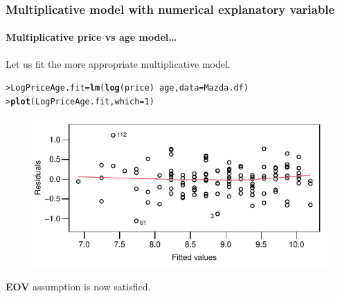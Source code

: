 \documentclass{beamer}\usepackage[]{graphicx}\usepackage[]{xcolor}
\makeatletter
\newcommand{\hlnum}[1]{\textcolor[rgb]{0.686,0.059,0.569}{#1}}%
\newcommand{\hlopt}[1]{\textcolor[rgb]{0,0,0}{#1}}%
\newcommand{\hlstd}[1]{\textcolor[rgb]{0.345,0.345,0.345}{#1}}%
\newcommand{\hlkwb}[1]{\textcolor[rgb]{0.69,0.353,0.396}{#1}}%
\newcommand{\hlkwc}[1]{\textcolor[rgb]{0.333,0.667,0.333}{#1}}%
\newcommand{\hlkwd}[1]{\textcolor[rgb]{0.737,0.353,0.396}{\textbf{#1}}}%
\newenvironment{kframe}{%
 \def\at@end@of@kframe{}%
 \ifinner\ifhmode%
  \def\at@end@of@kframe{\end{minipage}}%
  \begin{minipage}{\columnwidth}%
 \fi\fi%
 \def\FrameCommand##1{\hskip\@totalleftmargin \hskip-\fboxsep
 \colorbox{shadecolor}{##1}\hskip-\fboxsep
     \hskip-\linewidth \hskip-\@totalleftmargin \hskip\columnwidth}%
 \MakeFramed {\advance\hsize-\width
   \@totalleftmargin\z@ \linewidth\hsize
   \@setminipage}}%
 {\par\unskip\endMakeFramed%
 \at@end@of@kframe}
\newenvironment{knitrout}{}{} %
\makeatother
\begin{document}
\begin{frame}[fragile, t]
\frametitle{Multiplicative model with numerical explanatory variable}
\framesubtitle{Multiplicative price vs age model\ldots}
Let us fit the more appropriate multiplicative model.
\begin{knitrout}\scriptsize
{}\color{fgcolor}\begin{kframe}
\begin{alltt}
\hlstd{> }\hlstd{LogPriceAge.fit}\hlkwb{=}\hlkwd{lm}\hlstd{(}\hlkwd{log}\hlstd{(price)}\hlopt{~}\hlstd{age,} \hlkwc{data}\hlstd{=Mazda.df)}
\hlstd{> }\hlkwd{plot}\hlstd{(LogPriceAge.fit,}\hlkwc{which}\hlstd{=}\hlnum{1}\hlstd{)}
\end{alltt}
\end{kframe}
\end{knitrout}



\begin{figure}
  \centering
  \includegraphics{figure/RC-H06-029}
\end{figure}

\textbf{EOV} assumption is now satisfied. 

\end{frame}
\end{document}
